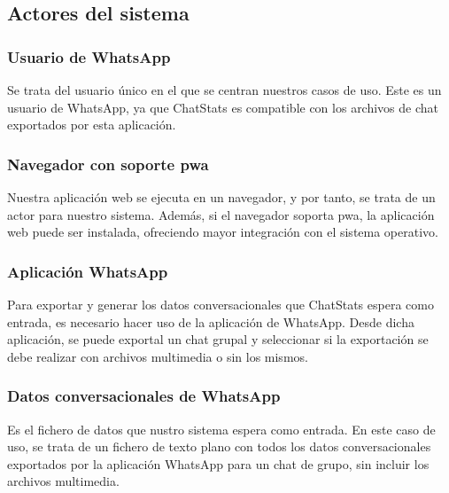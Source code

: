 \subsection{Actores del sistema}
\label{subsec:system-actors}

\subsubsection{Usuario de WhatsApp}

Se trata del usuario único en el que se centran nuestros casos de uso. Este es un usuario de WhatsApp, ya que ChatStats es compatible con los archivos de chat exportados por esta aplicación.

\subsubsection{Navegador con soporte \acrfull{pwa}}

Nuestra aplicación web se ejecuta en un navegador, y por tanto, se trata de un actor para nuestro sistema. Además, si el navegador soporta \acrfull{pwa}, la aplicación web puede ser instalada, ofreciendo mayor integración con el sistema operativo.

\subsubsection{Aplicación WhatsApp}

Para exportar y generar los datos conversacionales que ChatStats espera como entrada, es necesario hacer uso de la aplicación de WhatsApp. Desde dicha aplicación, se puede exportal un chat grupal y seleccionar si la exportación se debe realizar con archivos multimedia o sin los mismos.

\subsubsection{Datos conversacionales de WhatsApp}

Es el fichero de datos que nustro sistema espera como entrada. En este caso de uso, se trata de un fichero de texto plano con todos los datos conversacionales exportados por la aplicación WhatsApp para un chat de grupo, sin incluir los archivos multimedia.

